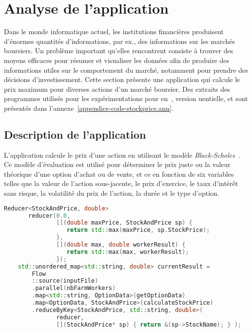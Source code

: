 \section{Analyse de l'application }
\label{stockprice.sect}

Dans le monde informatique actuel, les institutions financi\`eres produisent d'\'enormes quantit\'es d'informations, par ex., des informations sur les march\'es boursiers. Un probl\`eme important qu'elles rencontrent consiste \`a trouver des moyens efficaces pour r\'esumer et visualiser les donn\'ees afin de produire des informations utiles sur le comportement du march\'e, notamment pour prendre des d\'ecisions d'investissement. Cette section pr\'esente une application qui calcule le prix maximum pour diverses actions d'un marché boursier. Des extraits des programmes utilis\'es pour les exp\'erimentations pour  en~,  version uentielle,  et  sont pr\'esent\'es dans l'annexe~\ref{appendice-code-stockprice.ann}.


\subsection{Description de l'application}

L'application  calcule le prix d'une action en utilisant le modèle \emph{Black-Scholes}~\citep{macbeth1979empirical}. Ce mod\`ele d'\'evaluation est utilis\'e pour d\'eterminer le prix juste ou la valeur th\'eorique d'une option d'achat ou de vente, et ce en fonction de six variables telles que la valeur de l'action sous-jacente, le prix d'exercice, le taux d'int\'er\^et sans risque, la volatilit\'e du prix de l'action, la dur\'ee et le type d'option. 

\begin{lstlisting}[float,label={StockPrice-code.listing},gobble=4,basicstyle=\ttfamily\footnotesize,language=c++,caption={Extrait du code de \TT{StockPrice.cpp} (version \ppff).},frame=single]
    Reducer<StockAndPrice, double>
       reducer(0.0, 
               [](double maxPrice, StockAndPrice sp) {
                  return std::max(maxPrice, sp.StockPrice);
               },
               [](double max, double workerResult) { 
                  return std::max(max, workerResult);
               });
    std::unordered_map<std::string, double> currentResult =
        Flow
        ::source(inputFile)
        .parallel(nbFarmWorkers)
        .map<std::string, OptionData>(getOptionData)
        .map<OptionData, StockAndPrice>(calculateStockPrice)
        .reduceByKey<StockAndPrice, std::string, double>(
               reducer, 
               [](StockAndPrice* sp) { return &(sp->StockName); } );
\end{lstlisting}


